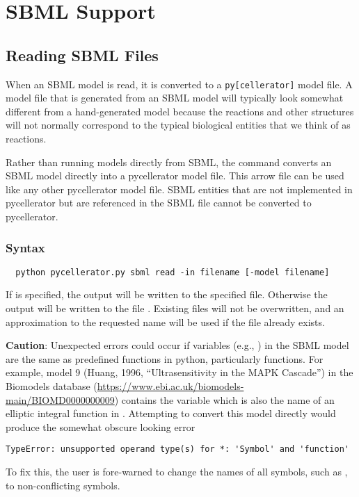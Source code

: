 \section[SBML]{SBML Support}



\subsection{Reading SBML Files}


When an SBML model is read, it is converted to a {\tt py[cellerator]} model file.  A model file that is generated from an SBML model will typically look somewhat different from a hand-generated model because the reactions and other structures will not normally correspond to the typical biological entities that we think of as reactions.

Rather than running models directly from SBML, the  command converts an SBML model directly into a pycellerator model file. This arrow file can be used like any other pycellerator model file. SBML entities that are not implemented in pycellerator but are referenced in the SBML file cannot be converted to pycellerator. 



\subsubsection{Syntax}

\begin{lstlisting}
  python pycellerator.py sbml read -in filename [-model filename]
\end{lstlisting}
If  is specified, the output will be written to the specified file. Otherwise the output will be written to the file . Existing files will not be overwritten, and an approximation to the requested name will be used if the file already exists. 


\textbf{Caution}: Unexpected errors could occur if variables (e.g., ) in the SBML model are the same as predefined functions in python, particularly  functions. For example, model 9 (Huang, 1996, ``Ultrasensitivity in the MAPK Cascade'') 
in the Biomodels database (\url{https://www.ebi.ac.uk/biomodels-main/BIOMD0000000009}) contains the variable  which is also the name of an elliptic integral function in . Attempting to convert this model directly would produce the somewhat obscure looking error
\begin{lstlisting}
TypeError: unsupported operand type(s) for *: 'Symbol' and 'function'
\end{lstlisting}
To fix this, the user is fore-warned to change the names of all symbols, such as , to non-conflicting symbols. 

